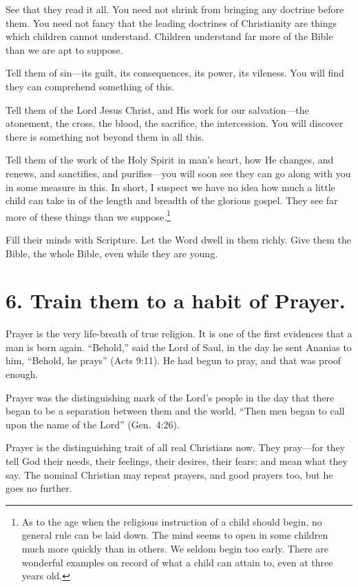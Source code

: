 \documentclass[
]{book}
\begin{document}
See that they read it all. You need not shrink from bringing any doctrine before them. You need not fancy that the leading doctrines of Christianity are things which children cannot understand. Children understand far more of the Bible than we are apt to suppose.

Tell them of sin---its guilt, its consequences, its power, its vileness. You will find they can comprehend something of this.

Tell them of the Lord Jesus Christ, and His work for our salvation---the atonement, the cross, the blood, the sacrifice, the intercession. You will discover there is something not beyond them in all this.

Tell them of the work of the Holy Spirit in man's heart, how He changes, and renews, and sanctifies, and purifies---you will soon see they can go along with you in some measure in this. In short, I suspect we have no idea how much a little child can take in of the length and breadth of the glorious gospel. They see far more of these things than we suppose.\footnote{As to the age when the religious instruction of a child should begin, no general rule can be laid down. The mind seems to open in some children much more quickly than in others. We seldom begin too early. There are wonderful examples on record of what a child can attain to, even at three years old.}

Fill their minds with Scripture. Let the Word dwell in them richly. Give them the Bible, the whole Bible, even while they are young.

\hypertarget{train-them-to-a-habit-of-prayer.}{%
\section*{6. Train them to a habit of Prayer.}\label{train-them-to-a-habit-of-prayer.}}

Prayer is the very life-breath of true religion. It is one of the first evidences that a man is born again. ``Behold,'' said the Lord of Saul, in the day he sent Ananias to him, ``Behold, he prays'' (Acts 9:11). He had begun to pray, and that was proof enough.

Prayer was the distinguishing mark of the Lord's people in the day that there began to be a separation between them and the world. ``Then men began to call upon the name of the Lord'' (Gen.~4:26).

Prayer is the distinguishing trait of all real Christians now. They pray---for they tell God their needs, their feelings, their desires, their fears; and mean what they say. The nominal Christian may repeat prayers, and good prayers too, but he goes no further.
\end{document}
